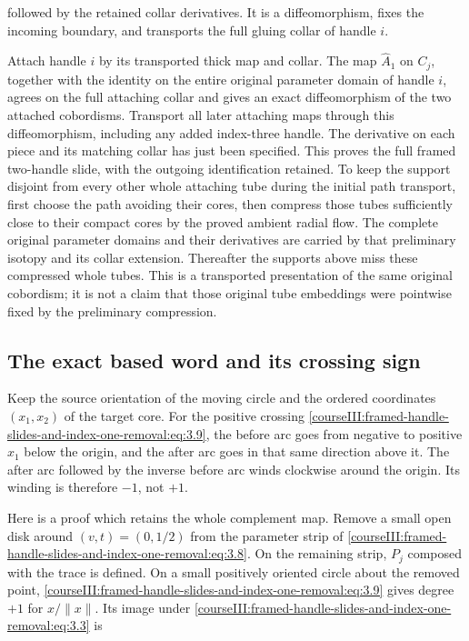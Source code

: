 followed by the retained collar derivatives. It is a diffeomorphism, fixes the incoming boundary, and transports the full gluing collar of handle \(i\).

Attach handle \(i\) by its transported thick map and collar. The map \(\widehat A_1\) on \(C_j\), together with the identity on the entire original parameter domain of handle \(i\), agrees on the full attaching collar and gives an exact diffeomorphism of the two attached cobordisms. Transport all later attaching maps through this diffeomorphism, including any added index-three handle. The derivative on each piece and its matching collar has just been specified. This proves the full framed two-handle slide, with the outgoing identification retained. To keep the support disjoint from every other whole attaching tube during the initial path transport, first choose the path avoiding their cores, then compress those tubes sufficiently close to their compact cores by the proved ambient radial flow. The complete original parameter domains and their derivatives are carried by that preliminary isotopy and its collar extension. Thereafter the supports above miss these compressed whole tubes. This is a transported presentation of the same original cobordism; it is not a claim that those original tube embeddings were pointwise fixed by the preliminary compression.

\subsection{The exact based word and its crossing sign}
\label{courseIII:framed-handle-slides-and-index-one-removal:slide-based-sign}

\label{courseIII:framed-handle-slides-and-index-one-removal:section-4}\label{courseIII:low-index-slides:4}

Keep the source orientation of the moving circle and the ordered coordinates \((x_1,x_2)\) of the target core. For the positive crossing \eqref{courseIII:framed-handle-slides-and-index-one-removal:eq:3.9}, the before arc goes from negative to positive \(x_1\) below the origin, and the after arc goes in that same direction above it. The after arc followed by the inverse before arc winds clockwise around the origin. Its winding is therefore \(-1\), not \(+1\).

Here is a proof which retains the whole complement map. Remove a small open disk around \((v,t)=(0,1/2)\) from the parameter strip of \eqref{courseIII:framed-handle-slides-and-index-one-removal:eq:3.8}. On the remaining strip, \(P_j\) composed with the trace is defined. On a small positively oriented circle about the removed point, \eqref{courseIII:framed-handle-slides-and-index-one-removal:eq:3.9} gives degree \(+1\) for \(x/\|x\|\). Its image under \eqref{courseIII:framed-handle-slides-and-index-one-removal:eq:3.3} is

